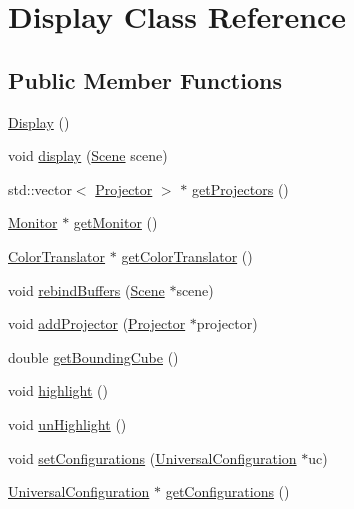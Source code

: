 \hypertarget{classDisplay}{
\section{Display Class Reference}
\label{classDisplay}
}
\subsection*{Public Member Functions}
\begin{DoxyCompactItemize}
\item 
\hyperlink{classDisplay_ae972fffea6f7ca1d627ef48c3d841bb3}{Display} ()
\item 
void \hyperlink{classDisplay_a83c8747af2e4a4e2c2f59f9e30dd12d7}{display} (\hyperlink{classScene}{Scene} scene)
\item 
std::vector$<$ \hyperlink{classProjector}{Projector} $>$ $\ast$ \hyperlink{classDisplay_af2463d86a214259bb89fb00e0ced3065}{getProjectors} ()
\item 
\hyperlink{classMonitor}{Monitor} $\ast$ \hyperlink{classDisplay_ab27364120a2b6e513d14e9ae39b031f9}{getMonitor} ()
\item 
\hyperlink{classColorTranslator}{ColorTranslator} $\ast$ \hyperlink{classDisplay_a2e319a064952d0a7b1c510d23682a784}{getColorTranslator} ()
\item 
void \hyperlink{classDisplay_a76d139338c3ae5903f9cc2c6505a41aa}{rebindBuffers} (\hyperlink{classScene}{Scene} $\ast$scene)
\item 
void \hyperlink{classDisplay_a30e759876c38401a623f31095d161054}{addProjector} (\hyperlink{classProjector}{Projector} $\ast$projector)
\item 
double \hyperlink{classDisplay_a06d5de5525021158585fb4fdfd19fabb}{getBoundingCube} ()
\item 
void \hyperlink{classDisplay_afd96105e1c0b6d8e0e6433331482fe6e}{highlight} ()
\item 
void \hyperlink{classDisplay_ad5cca0a6d4980aaf229de2be156231cd}{unHighlight} ()
\item 
void \hyperlink{classDisplay_a541e55345bf13390a80eb3f1706b5bde}{setConfigurations} (\hyperlink{classUniversalConfiguration}{UniversalConfiguration} $\ast$uc)
\item 
\hyperlink{classUniversalConfiguration}{UniversalConfiguration} $\ast$ \hyperlink{classDisplay_ad6fb864e50d126c22c3de548a7fbe666}{getConfigurations} ()
\end{DoxyCompactItemize}


